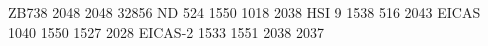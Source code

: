ZB738 2048 2048 32856
ND        524 1550 1018 2038
HSI         9 1538  516 2043
EICAS    1040 1550 1527 2028
EICAS-2  1533 1551 2038 2037
